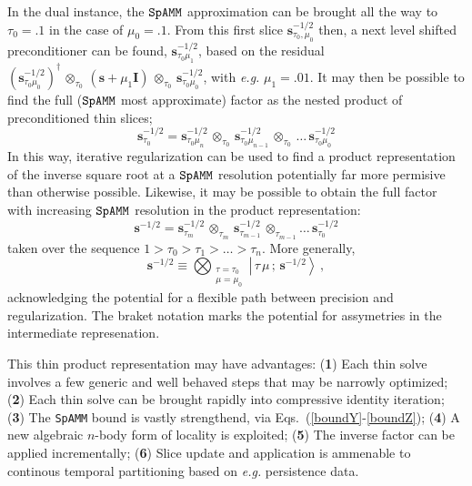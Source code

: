 \documentclass[letterpaper,twocolumn,amsmath,amsfont,amssymb,english,aps,jcp,preprintnumbers,groupaddress,nofootinbib,tightenlines,floatfix]{revtex4}
\newcommand{\mat}[1]{\boldsymbol{#1}}
\newcommand{\oto}{ {\scriptstyle \otimes}_{ \! \tau_0 } }
\newcommand{\otm}{ {\scriptstyle \otimes}_{ \! \tau_m } }
\newcommand{\otmm}{ {\scriptstyle \otimes}_{ \! \tau_{m-1}}}
\theoremstyle{plain}
\theoremstyle{remark}
\theoremstyle{plain}
\begin{document}
In the dual instance, the $\tt SpAMM$ approximation can be brought all the way to  $\tau_0 = .1$ in the case of $\mu_0 = .1$.
From this first slice  $\mat{s}^{-1/2}_{\tau_0, \mu_0}$ then, a next level shifted preconditioner can be found, 
$\mat{s}^{-1/2}_{\tau_0 \mu_1}$, based on the residual 
$\left(\mat{s}^{-1/2}_{\tau_0\mu_0} \right)^\dagger \, \oto \, \left(\mat{s}+\mu_1 \mat{I} \right)  \, \oto \,\mat{s}^{-1/2}_{\tau_0 \mu_0} $, with {\em e.g.} 
$\mu_1= .01$. It may then be possible to find the full ($\tt SpAMM$ most approximate) 
factor as the nested product of preconditioned thin slices;
\begin{equation}
\mat{s}^{-1/2}_{\tau_0} = \mat{s}^{-1/2}_{\tau_0 \mu_n} \, \oto \, \mat{s}^{-1/2}_{\tau_0 \mu_{n-1}} \, \oto \, \dots  \,  \mat{s}^{-1/2}_{\tau_0 \mu_0}
\end{equation}
In this way, 
iterative regularization can be used to find a product representation of the inverse square root at a $\tt SpAMM$ resolution 
potentially far more permisive than otherwise possible. 
Likewise, it may be possible to obtain the full factor with increasing $\tt SpAMM$ resolution in the product representation:
\begin{equation}
\mat{s}^{-1/2} = \mat{s}^{-1/2}_{\tau_m} \, \otm \,  \mat{s}^{-1/2}_{\tau_{m-1}} \, \otmm \dots \, \mat{s}^{-1/2}_{\tau_0}
\end{equation}taken over the sequence $1 > \tau_0 > \tau_1 > \dots > \tau_n $.  More generally,
\begin{equation} \label{spammsandwich}
\mat{s}^{-1/2} \equiv \bigotimes_{\substack{\tau=\tau_0 \\ \mu=\mu_0   } } {\left|\, \tau\, \mu \, ; \, \scriptstyle{\mat{s}^{-1/2}}  \right>}  \, ,
\end{equation}
acknowledging the potential for a flexible path between precision and regularization. The braket notation marks 
the potential for assymetries in the intermediate represenation.  

This thin product representation may have advantages: 
({\bf{1}}) Each thin solve involves a few generic and well behaved steps that may be narrowly optimized;
({\bf{2}}) Each thin solve can be brought rapidly into compressive identity iteration; 
({\bf{3}}) The {\tt SpAMM} bound is vastly strengthend, via Eqs.~(\ref{boundY}-\ref{boundZ}); 
({\bf{4}}) A new algebraic $n$-body form of locality is exploited; 
({\bf{5}}) The inverse factor can be applied incrementally;
({\bf{6}}) Slice update and application is ammenable to continous temporal partitioning based on {\em e.g.} persistence data.
\end{document}
